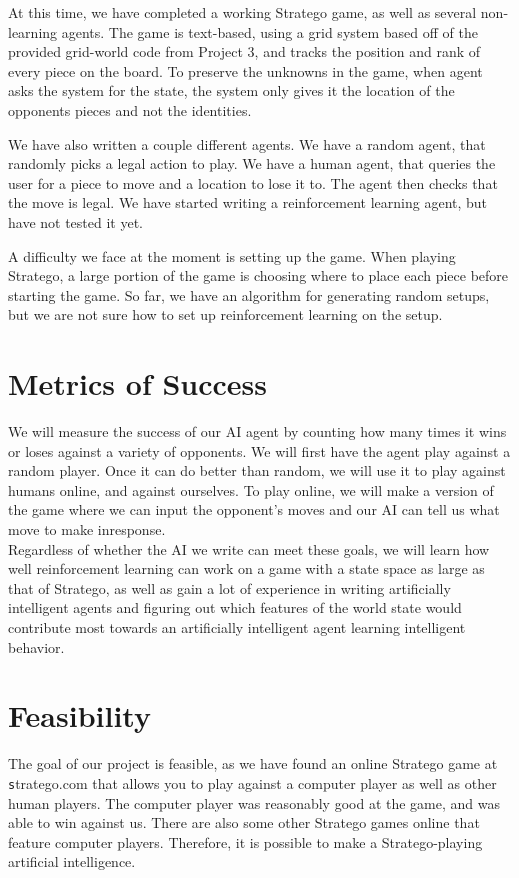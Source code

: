 \documentclass[letterpaper]{article}
\begin{document}
At this time, we have completed a working Stratego game, as well as several non-learning agents. The game is text-based, using a grid system based off of the provided grid-world code from Project 3, and tracks the position and rank of every piece on the board. To preserve the unknowns in the game, when agent asks the system for the state, the system only gives it the location of the opponents pieces and not the identities.

We have also written a couple different agents. We have a random agent, that randomly picks a legal action to play. We have a human agent, that queries the user for a piece to move and a location to lose it to. The agent then checks that the move is legal. We have started writing a reinforcement learning agent, but have not tested it yet.

A difficulty we face at the moment is setting up the game. When playing Stratego, a large portion of the game is choosing where to place each piece before starting the game. So far, we have an algorithm for generating random setups, but we are not sure how to set up reinforcement learning on the setup. \\

\section{Metrics of Success}
We will measure the success of our AI agent by counting how many times it wins or loses against a variety of opponents. We will first have the agent play against a random player. Once it can do better than random, we will use it to play against humans online, and against ourselves.  To play online, we will make a version of the game where we can input the opponent's moves and our AI can tell us what move to make inresponse.\\

Regardless of whether the AI we write can meet these goals, we will learn how well reinforcement learning can work on a game with a state space as large as that of Stratego, as well as gain a lot of experience in writing artificially intelligent agents and figuring out which features of the world state would contribute most towards an artificially intelligent agent learning intelligent behavior.
\\

\section{Feasibility}
The goal of our project is feasible, as we have found an online Stratego game at {\texttt stratego.com} that allows you to play against a computer player as well as other human players. The computer player was reasonably good at the game, and was able to win against us. There are also some other Stratego games online that feature computer players. Therefore, it is possible to make a Stratego-playing artificial intelligence. 
\\
\end{document}
